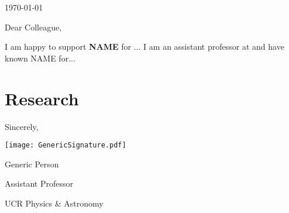 \documentclass[12pt]{article}
\begin{document}
\thispagestyle{flipsfirstpage} 	%
\vspace*{.25in}
\today


\bigskip  

Dear Colleague, \par \bigskip 


I am happy to support \textbf{NAME} for ...
I am an assistant professor at \UCRiverside and have known NAME for...
%
\lipsum[1-2]

\section{Research}

\lipsum[1-4]

\vspace{1cm}
\hspace{.5\textwidth}
\begin{minipage}[]{5in}
Sincerely, \par \medskip


\texttt{[image: GenericSignature.pdf]} \par
Generic Person\par
Assistant Professor\par
UCR Physics \& Astronomy
\end{minipage}

\end{document}
